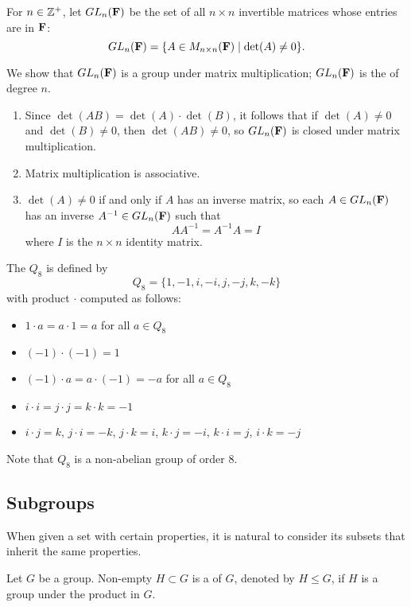 \begin{example}
For $n\in\mathbb Z^+$, let $GL_n(\mathbf F)$ be the set of all $n\times n$ invertible matrices whose entries are in $\mathbf F$:
\[GL_n(\mathbf F)=\{A\in M_{n\times n}(\mathbf F)\mid\det(A)\neq0\}.\]

We show that $GL_n(\mathbf F)$ is a group under matrix multiplication; $GL_n(\mathbf F)$ is the  of degree $n$.
\begin{enumerate}[label=(\roman*)]
\item Since $\det(AB)=\det(A)\cdot\det(B)$, it follows that if $\det(A)\neq0$ and $\det(B)\neq0$, then $\det(AB)\neq0$, so $GL_n(\mathbf F)$ is closed under matrix multiplication.
\item Matrix multiplication is associative.
\item $\det(A)\neq0$ if and only if $A$ has an inverse matrix, so each $A\in GL_n(\mathbf F)$ has an inverse $A^{-1}\in GL_n(\mathbf F)$ such that
\[AA^{-1}=A^{-1}A=I\]
where $I$ is the $n\times n$ identity matrix.
\end{enumerate}
\end{example}

\begin{example}
The  $Q_8$ is defined by
\[Q_8=\{1,-1,i,-i,j,-j,k,-k\}\]
with product $\cdot$ computed as follows:
\begin{itemize}
\item $1\cdot a=a\cdot 1=a$ for all $a\in Q_8$
\item $(-1)\cdot(-1)=1$
\item $(-1)\cdot a=a\cdot(-1)=-a$ for all $a\in Q_8$
\item $i\cdot i=j\cdot j=k\cdot k=-1$
\item $i\cdot j=k$, $j\cdot i=-k$, $j\cdot k=i$, $k\cdot j=-i$, $k\cdot i=j$, $i\cdot k=-j$
\end{itemize}
Note that $Q_8$ is a non-abelian group of order $8$.
\end{example}

\subsection{Subgroups}
When given a set with certain properties, it is natural to consider its subsets that inherit the same properties.

\begin{definition}[Subgroup]
Let $G$ be a group. Non-empty $H\subset G$ is a  of $G$, denoted by $H\le G$, if $H$ is a group under the product in $G$.
\end{definition}

